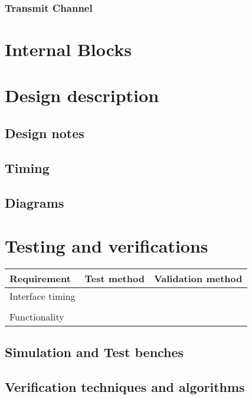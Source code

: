 \documentclass[a4paper,11pt]{article}
\begin{document}
\subsubsection{Transmit Channel}


\section{Internal Blocks}


\section{Design description}

\subsection{Design notes}
\subsection{Timing}
\subsection{Diagrams}



\section{Testing and verifications}


\begin{tabular}{|l|l|l|}
\hline
Requirement & Test method & Validation method \\
\hline
\hline
Interface timing & &\\
\hline
& & \\
\hline
\hline
Functionality & & \\
\hline
\end{tabular}
\subsection{Simulation and Test benches}

\subsection{Verification techniques and algorithms}
\end{document}
